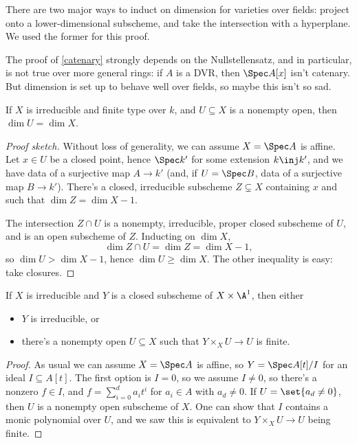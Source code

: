 There are two major ways to induct on dimension for varieties over fields: project onto a lower-dimensional
subscheme, and take the intersection with a hyperplane. We used the former for this proof.
\begin{rem}
The proof of \cref{catenary} strongly depends on the Nullstellensatz, and in particular, is not true over more
general rings: if $A$ is a DVR, then $\Spec A[x]$ isn't catenary. But dimension is set up to behave well over
fields, so maybe this isn't so sad.
\end{rem}
\begin{cor}
If $X$ is irreducible and finite type over $k$, and $U\subseteq X$ is a nonempty open, then $\dim U = \dim X$.
\end{cor}
\begin{proof}[Proof sketch]
Without loss of generality, we can assume $X = \Spec A$ is affine. Let $x \in U$ be a closed point, hence $\Spec
k'$ for some extension $k\inj k'$, and we have data of a surjective map $A\to k'$ (and, if $U = \Spec B$, data of a
surjective map $B\to k'$). There's a closed, irreducible subscheme $Z\subsetneq X$ containing $x$ and such that
$\dim Z = \dim X - 1$.

The intersection $Z\cap U$ is a nonempty, irreducible, proper closed subscheme of $U$, and is an open subscheme of
$Z$. Inducting on $\dim X$,
\begin{equation}
	\dim Z\cap U = \dim Z = \dim X - 1,
\end{equation}
so $\dim U > \dim X - 1$, hence $\dim U\ge\dim X$. The other inequality is easy: take closures.
\end{proof}
\begin{lem}
If $X$ is irreducible and $Y$ is a closed subscheme of $X\times\A^1$, then either
\begin{itemize}
	\item $Y$ is irreducible, or
	\item there's a nonempty open $U\subseteq X$ such that $Y\times_X U\to U$ is finite.
\end{itemize}
\end{lem}
\begin{proof}
As usual we can assume $X = \Spec A$ is affine, so $Y = \Spec A[t]/I$ for an ideal $I\subseteq A[t]$. The first
option is $I = 0$, so we assume $I \ne 0$, so there's a nonzero $f\in I$, and $f = \sum_{i=0}^d a_it^i$ for $a_i\in
A$ with $a_d\ne 0$. If $U = \set{a_d\ne 0}$, then $U$ is a nonempty open subscheme of $X$. One can show that $I$
contains a monic polynomial over $U$, and we saw this is equivalent to $Y\times_X U\to U$ being finite.
\end{proof}
